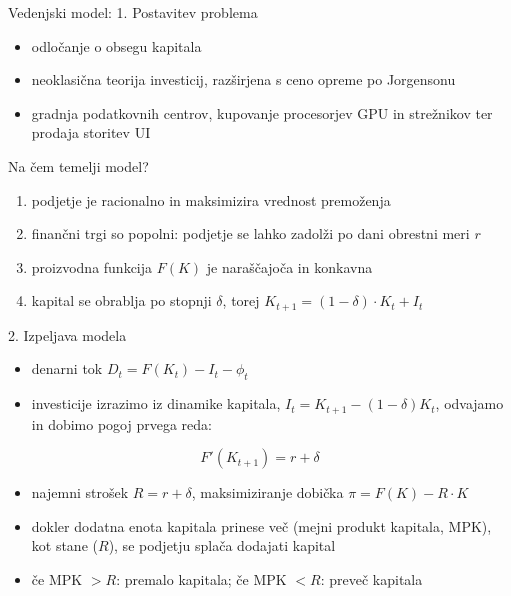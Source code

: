 \documentclass[aspectratio=169,11pt]{beamer}
\begin{document}
\begin{frame}{Vedenjski model: 1. Postavitev problema}
\begin{itemize}
\item odločanje o obsegu kapitala
\item neoklasična teorija investicij, razširjena s ceno opreme po Jorgensonu
\item gradnja podatkovnih centrov, kupovanje procesorjev GPU in strežnikov ter prodaja storitev UI
\end{itemize}
\begin{block}{Na čem temelji model?}
\begin{enumerate}
\item podjetje je racionalno in maksimizira vrednost premoženja
\item finančni trgi so popolni: podjetje se lahko zadolži po dani obrestni meri $r$
\item proizvodna funkcija $F(K)$ je naraščajoča in konkavna
\item kapital se obrablja po stopnji $\delta$, torej $K_{t+1} = (1-\delta)\cdot K_t + I_t$
\end{enumerate}
\end{block}
\end{frame}

\begin{frame}{2. Izpeljava modela}
\begin{itemize}
\item denarni tok $D_t = F(K_t) - I_t - \phi_t$
\item investicije izrazimo iz dinamike kapitala, $I_t = K_{t+1} - (1-\delta)K_t$, odvajamo in dobimo pogoj prvega reda:
\end{itemize}
\[
\boxed{F'(K_{t+1}) = r + \delta}
\]
\begin{itemize}
\item najemni strošek $R = r + \delta$, maksimiziranje dobička $\pi = F(K) - R\cdot K$
\item dokler dodatna enota kapitala prinese več (mejni produkt kapitala, MPK), kot stane ($R$), se podjetju splača dodajati kapital
\item če MPK $> R$: premalo kapitala; če MPK $< R$: preveč kapitala
\end{itemize}
\end{frame}
\end{document}
